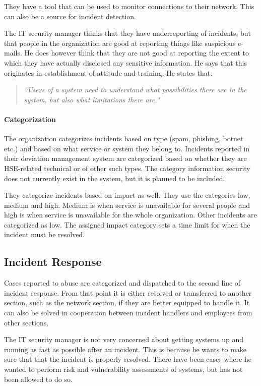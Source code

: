 They have a tool that can be used to monitor connections to their network. This can also be a source for incident detection.

The IT security manager thinks that they have underreporting of incidents, but that people in the organization are good at reporting things like suspicious e-mails. He does however think that they are not good at reporting the extent to which they have actually disclosed any sensitive information. He says that this originates in establishment of attitude and training. He states that:

\begin{quote}
\textit{``Users of a system need to understand what possibilities there are in the system, but also what limitations there are."} 
\end{quote}

\paragraph{Categorization}
The organization categorizes incidents based on type (spam, phishing, botnet etc.) and based on what service or system they belong to. Incidents reported in their deviation management system are categorized based on whether they are \ac{HSE}-related technical or of other such types. The category information security does not currently exist in the system, but it is planned to be included.

They categorize incidents based on impact as well. They use the categories low, medium and high. Medium is when service is unavailable for several people and high is when service is unavailable for the whole organization. Other incidents are categorized as low. The assigned impact category sets a time limit for when the incident must be resolved.

\subsection{Incident Response}
Cases reported to abuse are categorized and dispatched to the second line of incident response. %
From that point it is either resolved or transferred to another section, such as the network section, if they are better equipped to handle it. It can also be solved in cooperation between incident handlers and employees from other sections.

The IT security manager is not very concerned about getting systems up and running as fast as possible after an incident. This is because he wants to make sure that that the incident is properly resolved. There have been cases where he wanted to perform risk and vulnerability assessments of systems, but has not been allowed to do so.

